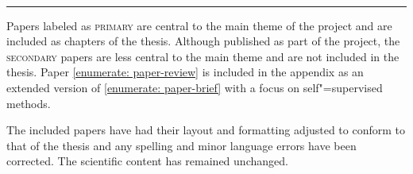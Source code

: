 \vspace{5mm}

\raggedright\par\noindent\hspace{8mm}{\Large\scshape secondary}\\[-2mm]

\raggedleft\rule{\textwidth - 8mm}{0.4pt}

\begin{enumerate}[leftmargin=8mm,topsep=0mm,label={[\Alph*]}]
    \setcounter{enumi}{6}
    \item {} \shared \label{enumerate: paper-review}
    \item {} \co
    \item {} \co %
\end{enumerate}

\justifying

\vspace{5mm}

\noindent Papers labeled as \textsc{primary} are central to the main theme of the project and are included as chapters of the thesis. 
Although published as part of the project, the \textsc{secondary} papers are less central to the main theme and are not included in the thesis. 
Paper \ref{enumerate: paper-review} is included in the appendix as an extended version of \ref{enumerate: paper-brief} with a focus on self"=supervised methods. 

\vspace{3mm}

\noindent The included papers have had their layout and formatting adjusted to conform to that of the thesis and any spelling and minor language errors have been corrected. The scientific content has remained unchanged.

\vspace*{\fill}
